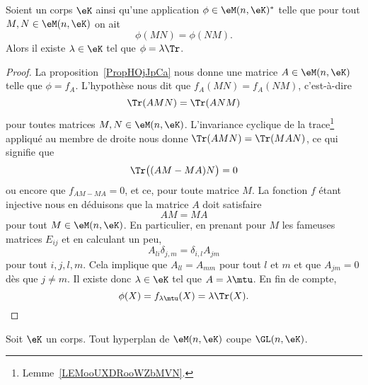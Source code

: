 \begin{corollary}
	Soient un corps \( \eK\) ainsi qu'une application \( \phi\in\eM(n,\eK)^*\) telle que pour tout \( M,N\in \eM(n,\eK)\) on ait
	\begin{equation}
		\phi(MN)=\phi(NM).
	\end{equation}
	Alors il existe \( \lambda\in \eK\) tel que \( \phi=\lambda\Tr\).
\end{corollary}

\begin{proof}
	La proposition~\ref{PropHOjJpCa} nous donne une matrice \( A\in \eM(n,\eK)\) telle que \( \phi=f_A\). L'hypothèse nous dit que \( f_A(MN)=f_A(NM)\), c'est-à-dire
	\begin{equation}
		\Tr(AMN)=\Tr(ANM)
	\end{equation}
	pour toutes matrices \( M, N\in \eM(n,\eK)\). L'invariance cyclique de la trace\footnote{Lemme~\ref{LEMooUXDRooWZbMVN}.} appliqué au membre de droite nous donne \( \Tr(AMN)=\Tr(MAN)\), ce qui signifie que
	\begin{equation}
		\Tr\big( (AM-MA)N \big)=0
	\end{equation}
	ou encore que \( f_{AM-MA}=0\), et ce, pour toute matrice \( M\). La fonction \( f\) étant injective nous en déduisons que la matrice \( A\) doit satisfaire
	\begin{equation}
		AM=MA
	\end{equation}
	pour tout \( M\in\eM(n,\eK)\). En particulier, en prenant pour \( M \) les fameuses matrices \( E_{ij}\) et en calculant un peu,
	\begin{equation}
		A_{li}\delta_{j,m}=\delta_{i,l}A_{jm}
	\end{equation}
	pour tout \( i,j,l,m\). Cela implique que \( A_{ll}=A_{mm}\) pour tout \( l\) et \( m\) et que \( A_{jm}=0\) dès que \( j\neq m\). Il existe donc \( \lambda\in \eK\) tel que \( A=\lambda\mtu\). En fin de compte,
	\begin{equation}
		\phi(X)=f_{\lambda\mtu}(X)=\lambda\Tr(X).
	\end{equation}
\end{proof}

\begin{corollary}       \label{CorICUOooPsZQrg}
	Soit \( \eK\) un corps. Tout hyperplan de \( \eM(n,\eK)\) coupe \( \GL(n,\eK)\).
\end{corollary}

